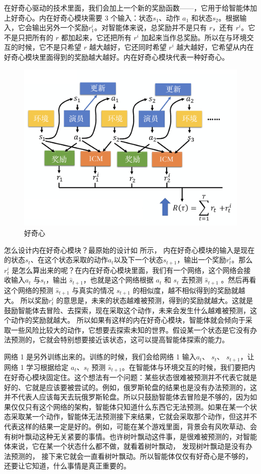 在好奇心驱动的技术里面，我们会加上一个新的奖励函数------，它用于给智能体加上好奇心。内在好奇心模块需要 3 个输入：状态$s_1$、动作 $a_1$ 和状态$s_2$。根据输入，它会输出另外一个奖励$r_1^i$。对智能体来说，总奖励并不是只有 $r$，还有 $r^i$。它不是只把所有的 $r$ 都加起来，它还把所有 $r^i$ 加起来当作总奖励。所以在与环境交互的时候，它不是只希望 $r$ 越大越好，它还同时希望 $r^i$ 越大越好，它希望从内在好奇心模块里面得到的奖励越大越好。内在好奇心模块代表一种好奇心。

\begin{figure}[htb]
    \centering
    \includegraphics[width=0.5\linewidth]{res/ch10/10.3}
    \caption{好奇心}
    \label{fig:fig10.3}
\end{figure}

怎么设计内在好奇心模块？最原始的设计如 所示，
内在好奇心模块的输入是现在的状态$s_t$、在这个状态采取的动作$a_t$以及下一个状态$s_{t+1}$，输出一个奖励$r^i_t$。那么 $r^i_t$  是怎么算出来的呢？在内在好奇心模块里面，我们有一个网络，这个网络会接收输入$a_t$ 与$s_t$，输出 $\hat{s}_{t+1}$，也就是这个网络根据 $a_t$ 和 $s_t$ 去预测  $\hat{s}_{t+1}$ 。然后再看这个网络的预测  $\hat{s}_{t+1}$ 与真实的情况 $s_{t+1}$ 的相似度，越不相似得到的奖励就越大。
所以奖励$r_t^i$ 的意思是，未来的状态越难被预测，得到的奖励就越大。这就是鼓励智能体去冒险、去探索，现在采取这个动作，未来会发生什么越难被预测，这个动作的奖励就越大。
所以如果有这样的内在好奇心模块，智能体就会倾向于采取一些风险比较大的动作，它想要去探索未知的世界。假设某一个状态是它没有办法预测的，它就会特别想要接近该状态，这可以提高智能体探索的能力。

网络 1 是另外训练出来的。训练的时候，我们会给网络 1 输入$a_t$、 $s_t$、 $s_{t+1}$，让网络 1 学习根据给定 $a_t$、$s_t$ 预测 $\hat{s}_{t+1}$。在智能体与环境交互的时候，我们要把内在好奇心模块固定住。这个想法有一个问题：某些状态很难被预测并不代表它就是好的、它就是应该要被尝试的。例如，俄罗斯轮盘的结果也是没有办法预测的，这并不代表人应该每天去玩俄罗斯轮盘。所以只鼓励智能体去冒险是不够的，因为如果仅仅只有这个网络的架构，智能体只知道什么东西它无法预测。如果在某一个状态采取某一个动作，智能体无法预测接下来结果，它就会采取那个动作，但这并不代表这样的结果一定是好的。例如，可能在某个游戏里面，背景会有风吹草动、会有树叶飘动这种无关紧要的事情。也许树叶飘动这件事，是很难被预测的，对智能体来说，它在某一个状态什么都不做，就看着树叶飘动，
发现树叶飘动是没有办法预测的，
接下来它就会一直看树叶飘动。所以智能体仅仅有好奇心是不够的，还要让它知道，什么事情是真正重要的。

